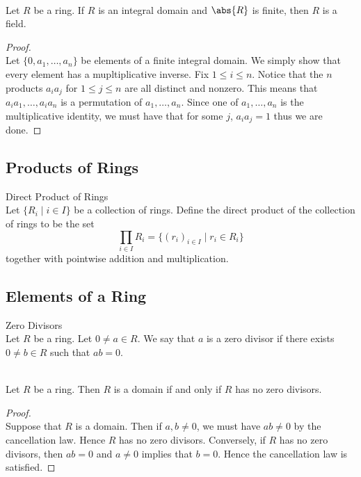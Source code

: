 \documentclass[a4paper]{article}
\begin{document}
\begin{prp}{}{}\\
Let $R$ be a ring. If $R$ is an integral domain and $\abs{R}$ is finite, then $R$ is a field. 
\begin{proof}\\
Let $\{0,a_1,\dots,a_n\}$ be elements of a finite integral domain. We simply show that every element has a mupltiplicative inverse. Fix $1\leq i\leq n$. Notice that the $n$ products $a_ia_j$ for $1\leq j\leq n$ are all distinct and nonzero. This means that $a_ia_1,\dots,a_ia_n$ is a permutation of $a_1,\dots,a_n$. Since one of $a_1,\dots,a_n$ is the multiplicative identity, we must have that for some $j$, $a_ia_j=1$ thus we are done. 
\end{proof}
\end{prp}

\subsection{Products of Rings}
\begin{defn}{Direct Product of Rings}{}\\
Let $\{R_i\;|\;i\in I\}$ be a collection of rings. Define the direct product of the collection of rings to be the set $$\prod_{i\in I}R_i=\{(r_i)_{i\in I}\;|\;r_i\in R_i\}$$ together with pointwise addition and multiplication. 
\end{defn}

\subsection{Elements of a Ring}
\begin{defn}{Zero Divisors}{}\\
Let $R$ be a ring. Let $0\neq a\in R$. We say that $a$ is a zero divisor if there exists $0\neq b\in R$ such that $ab=0$. 
\end{defn}

\begin{lmm}{}{}\\
Let $R$ be a ring. Then $R$ is a domain if and only if $R$ has no zero divisors. 
\begin{proof}\\
Suppose that $R$ is a domain. Then if $a,b\neq 0$, we must have $ab\neq 0$ by the cancellation law. Hence $R$ has no zero divisors. Conversely, if $R$ has no zero divisors, then $ab=0$ and $a\neq 0$ implies that $b=0$. Hence the cancellation law is satisfied. 
\end{proof}
\end{lmm}
\end{document}
